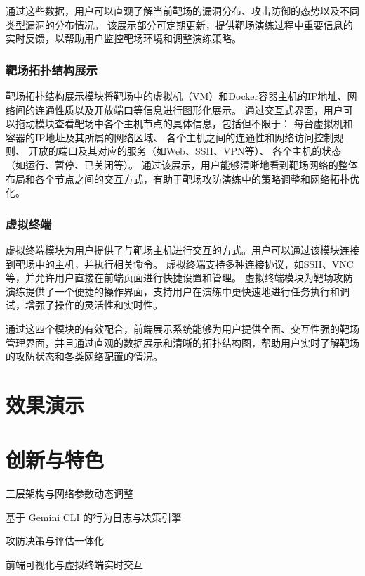\documentclass[lang=cn,10pt]{elegantbook}
\begin{document}
通过这些数据，用户可以直观了解当前靶场的漏洞分布、攻击防御的态势以及不同类型漏洞的分布情况。
该展示部分可定期更新，提供靶场演练过程中重要信息的实时反馈，以帮助用户监控靶场环境和调整演练策略。

\subsection{靶场拓扑结构展示}

靶场拓扑结构展示模块将靶场中的虚拟机（VM）和Docker容器主机的IP地址、网络间的连通性质以及开放端口等信息进行图形化展示。
通过交互式界面，用户可以拖动模块查看靶场中各个主机节点的具体信息，包括但不限于：
每台虚拟机和容器的IP地址及其所属的网络区域、  
各个主机之间的连通性和网络访问控制规则、  
开放的端口及其对应的服务（如Web、SSH、VPN等）、  
各个主机的状态（如运行、暂停、已关闭等）。
通过该展示，用户能够清晰地看到靶场网络的整体布局和各个节点之间的交互方式，有助于靶场攻防演练中的策略调整和网络拓扑优化。

\subsection{虚拟终端}

虚拟终端模块为用户提供了与靶场主机进行交互的方式。用户可以通过该模块连接到靶场中的主机，并执行相关命令。
虚拟终端支持多种连接协议，如SSH、VNC等，并允许用户直接在前端页面进行快捷设置和管理。
虚拟终端模块为靶场攻防演练提供了一个便捷的操作界面，支持用户在演练中更快速地进行任务执行和调试，增强了操作的灵活性和实时性。

通过这四个模块的有效配合，前端展示系统能够为用户提供全面、交互性强的靶场管理界面，并且通过直观的数据展示和清晰的拓扑结构图，帮助用户实时了解靶场的攻防状态和各类网络配置的情况。



\chapter{效果演示}



\chapter{创新与特色}
\begin{introduction}
  \item 三层架构与网络参数动态调整
  \item 基于 Gemini CLI 的行为日志与决策引擎
  \item 攻防决策与评估一体化
  \item 前端可视化与虚拟终端实时交互
\end{introduction}
\end{document}
